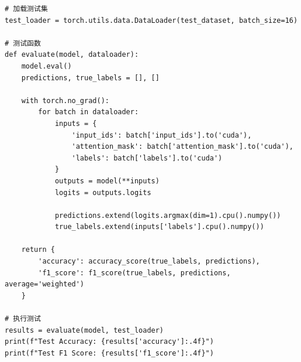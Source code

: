 \documentclass{cjc}
\begin{document}
\begin{verbatim}
# 加载测试集
test_loader = torch.utils.data.DataLoader(test_dataset, batch_size=16)

# 测试函数
def evaluate(model, dataloader):
    model.eval()
    predictions, true_labels = [], []
    
    with torch.no_grad():
        for batch in dataloader:
            inputs = {
                'input_ids': batch['input_ids'].to('cuda'),
                'attention_mask': batch['attention_mask'].to('cuda'),
                'labels': batch['labels'].to('cuda')
            }
            outputs = model(**inputs)
            logits = outputs.logits
            
            predictions.extend(logits.argmax(dim=1).cpu().numpy())
            true_labels.extend(inputs['labels'].cpu().numpy())
    
    return {
        'accuracy': accuracy_score(true_labels, predictions),
        'f1_score': f1_score(true_labels, predictions, average='weighted')
    }

# 执行测试
results = evaluate(model, test_loader)
print(f"Test Accuracy: {results['accuracy']:.4f}")
print(f"Test F1 Score: {results['f1_score']:.4f}")
\end{verbatim}
\end{document}
